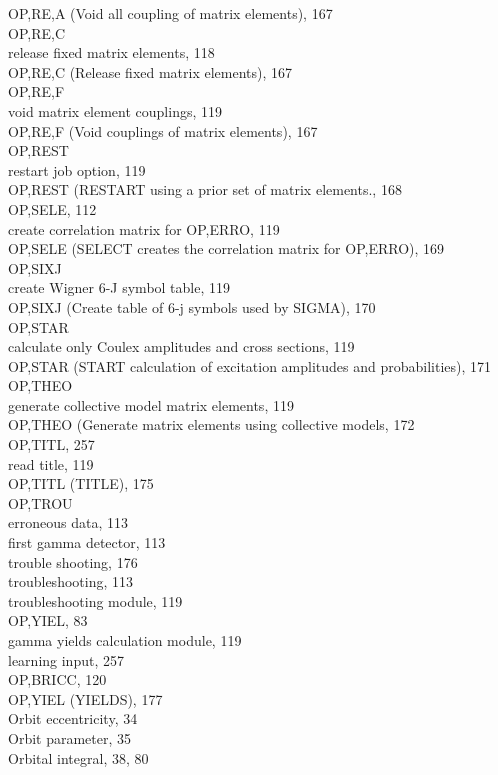 \documentclass[10pt]{article}
\begin{document}
OP,RE,A (Void all coupling of matrix elements), 167\\
OP,RE,C\\
release fixed matrix elements, 118\\
OP,RE,C (Release fixed matrix elements), 167\\
OP,RE,F\\
void matrix element couplings, 119\\
OP,RE,F (Void couplings of matrix elements), 167\\
OP,REST\\
restart job option, 119\\
OP,REST (RESTART using a prior set of matrix elements., 168\\
OP,SELE, 112\\
create correlation matrix for OP,ERRO, 119\\
OP,SELE (SELECT creates the correlation matrix for OP,ERRO), 169\\
OP,SIXJ\\
create Wigner 6-J symbol table, 119\\
OP,SIXJ (Create table of 6-j symbols used by SIGMA), 170\\
OP,STAR\\
calculate only Coulex amplitudes and cross sections, 119\\
OP,STAR (START calculation of excitation amplitudes and probabilities), 171\\
OP,THEO\\
generate collective model matrix elements, 119\\
OP,THEO (Generate matrix elements using collective models, 172\\
OP,TITL, 257\\
read title, 119\\
OP,TITL (TITLE), 175\\
OP,TROU\\
erroneous data, 113\\
first gamma detector, 113\\
trouble shooting, 176\\
troubleshooting, 113\\
troubleshooting module, 119\\
OP,YIEL, 83\\
gamma yields calculation module, 119\\
learning input, 257\\
OP,BRICC, 120\\
OP,YIEL (YIELDS), 177\\
Orbit eccentricity, 34\\
Orbit parameter, 35\\
Orbital integral, 38, 80
\end{document}

